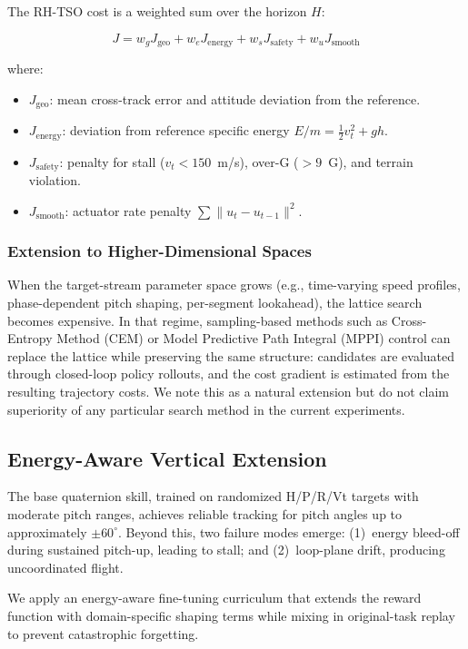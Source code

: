 \documentclass{article}
\begin{document}
The RH-TSO cost is a weighted sum over the horizon $H$:

\begin{equation}
  J = w_g J_{\text{geo}} + w_e J_{\text{energy}} + w_s J_{\text{safety}} + w_u J_{\text{smooth}}
\end{equation}

where:
\begin{itemize}
  \item $J_{\text{geo}}$: mean cross-track error and attitude deviation from the reference.
  \item $J_{\text{energy}}$: deviation from reference specific energy $E/m = \frac{1}{2}v_t^2 + gh$.
  \item $J_{\text{safety}}$: penalty for stall ($v_t < 150$~m/s), over-G ($>9$~G), and terrain violation.
  \item $J_{\text{smooth}}$: actuator rate penalty $\sum \|u_t - u_{t-1}\|^2$.
\end{itemize}

\subsubsection{Extension to Higher-Dimensional Spaces}

When the target-stream parameter space grows (e.g., time-varying speed profiles, phase-dependent pitch shaping, per-segment lookahead), the lattice search becomes expensive.
In that regime, sampling-based methods such as Cross-Entropy Method (CEM) or Model Predictive Path Integral (MPPI) control can replace the lattice while preserving the same structure: candidates are evaluated through closed-loop policy rollouts, and the cost gradient is estimated from the resulting trajectory costs.
We note this as a natural extension but do not claim superiority of any particular search method in the current experiments.

\subsection{Energy-Aware Vertical Extension}

The base quaternion skill, trained on randomized H/P/R/Vt targets with moderate pitch ranges, achieves reliable tracking for pitch angles up to approximately $\pm60^\circ$.
Beyond this, two failure modes emerge: (1)~energy bleed-off during sustained pitch-up, leading to stall; and (2)~loop-plane drift, producing uncoordinated flight.

We apply an energy-aware fine-tuning curriculum that extends the reward function with domain-specific shaping terms while mixing in original-task replay to prevent catastrophic forgetting.
\end{document}
